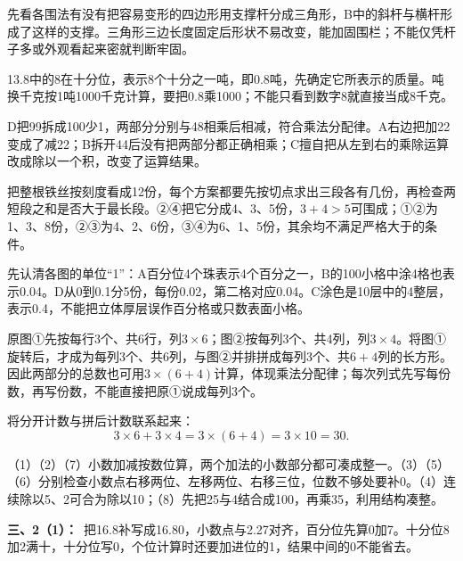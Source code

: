 \documentclass[multi=snippet,border=0pt]{standalone}
\newenvironment{snippet}[3]{\begin{minipage}{#1bp}\color{answerred}\fontsize{#2}{#3}\selectfont\raggedright}{\end{minipage}}
\begin{document}
\begin{snippet}{505}{11.5}{14}先看各围法有没有把容易变形的四边形用支撑杆分成三角形，B中的斜杆与横杆形成了这样的支撑。三角形三边长度固定后形状不易改变，能加固围栏；不能仅凭杆子多或外观看起来密就判断牢固。\end{snippet}
\begin{snippet}{505}{11.5}{14}13.8中的8在十分位，表示8个十分之一吨，即0.8吨，先确定它所表示的质量。吨换千克按1吨1000千克计算，要把0.8乘1000；不能只看到数字8就直接当成8千克。\end{snippet}
\begin{snippet}{505}{11.5}{14}D把99拆成100少1，两部分分别与48相乘后相减，符合乘法分配律。A右边把加22变成了减22；B拆开44后没有把两部分都正确相乘；C擅自把从左到右的乘除运算改成除以一个积，改变了运算结果。\end{snippet}
\begin{snippet}{505}{11.5}{14}把整根铁丝按刻度看成12份，每个方案都要先按切点求出三段各有几份，再检查两短段之和是否大于最长段。②④把它分成4、3、5份，\(3+4>5\)可围成；①②为1、3、8份，②③为4、2、6份，③④为6、1、5份，其余均不满足严格大于的条件。\end{snippet}
\begin{snippet}{505}{11.5}{14}先认清各图的单位“1”：A百分位4个珠表示4个百分之一，B的100小格中涂4格也表示0.04。D从0到0.1分5份，每份0.02，第二格对应0.04。C涂色是10层中的4整层，表示0.4，不能把立体厚层误作百分格或只数表面小格。\end{snippet}
\begin{snippet}{505}{11.5}{14}原图①先按每行3个、共6行，列\(3\times6\)；图②按每列3个、共4列，列\(3\times4\)。将图①旋转后，才成为每列3个、共6列，与图②并排拼成每列3个、共\(6+4\)列的长方形。因此两部分的总数也可用\(3\times(6+4)\)计算，体现乘法分配律；每次列式先写每份数，再写份数，不能直接把原①说成每列3个。\par 将分开计数与拼后计数联系起来：\[3\times6+3\times4=3\times(6+4)=3\times10=30.\]\end{snippet}
\begin{snippet}{505}{11.5}{14}（1）（2）（7）小数加减按数位算，两个加法的小数部分都可凑成整一。（3）（5）（6）分别检查小数点右移两位、左移两位、右移三位，位数不够处要补0。（4）连续除以5、2可合为除以10；（8）先把25与4结合成100，再乘35，利用结构凑整。\end{snippet}
\begin{snippet}{505}{11.5}{14}\textbf{三、2（1）：}\ 把16.8补写成16.80，小数点与2.27对齐，百分位先算0加7。十分位8加2满十，十分位写0，个位计算时还要加进位的1，结果中间的0不能省去。\end{snippet}
\end{document}
